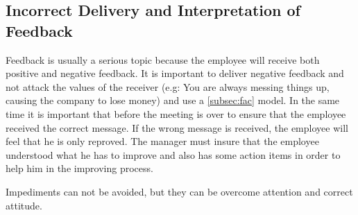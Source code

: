 \subsection{Incorrect Delivery and Interpretation of Feedback}
\label{subsec:incorrectfeedback}
Feedback is usually a serious topic because the employee will receive both positive and negative feedback. It is important to deliver negative feedback and not attack the values of the receiver (e.g: You are always messing things up, causing the company to lose money) and use a \cref{subsec:fac} model. In the same time it is important that before the meeting is over to ensure that the employee received the correct message. If the wrong message is received, the employee will feel that he is only reproved. The manager must insure that the employee understood what he has to improve and also has some action items in order to help him in the improving process.

Impediments can not be avoided, but they can be overcome attention and correct attitude.
